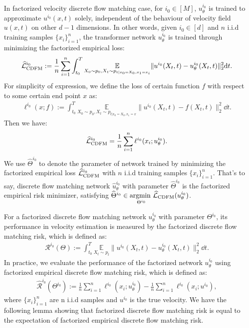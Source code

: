 \documentclass[12pt]{article}
\numberwithin{equation}{section}
\let\hat\widehat
\newcommand{\wh}{\widehat}
\renewcommand{\hat}{\wh}
\DeclareMathOperator*{\E}{{\mathbb{E}}}
\def\E{\mathbb{E}}
\theoremstyle{theoremstyle}
\numberwithin{equation}{section}
\numberwithin{theorem}{section}
\numberwithin{proposition}{section}
\numberwithin{definition}{section}
\numberwithin{lemma}{section}
\numberwithin{assumption}{section}
\numberwithin{remark}{section}
\begin{document}
In factorized velocity discrete flow matching case, for $i_0\in[M]$, $u_\theta^{i_0}$ is trained to approximate $u^{i_0}(x,t)$ solely, independent of the behaviour of velocity field $u(x,t)$ on other $d-1$ dimensions.
In other words, given $i_0\in[d]$ and $n$ i.i.d training samples $\{x_i\}_{i=1}^n$, the transformer network $u^{i_0}_\theta$ is trained through minimizing the factorized empirical loss:
\begin{align*}
    \hat{\mathcal{L}}^{i_0}_{\rm CDFM}:=\frac{1}{n}\sum_{i=1}^n\int_{t_0}^T \underset{X_0\sim p_0,X_t\sim p_{t|x_0=X_0,x_1=x_i}}{\E}\|u^{i_0}(X_t,t)-u^{i_0}_\theta(X_t,t)\|_2^2 \dd t.
\end{align*}
For simplicity of expression, we define the loss of certain function $f$ with respect to some certain end point $x$ as:
\begin{align*}
    \ell^{i_0}(x;f):=\int_{t_0}^T \underset{X_0\sim p_0,X_t\sim p_{t|x_0=X_0,x_1=x}}{\E}\|u^{i_0}(X_t,t)-f(X_t,t)\|_2^2 \dd t.
\end{align*}
Then we have:
\begin{align*}
    \hat{\mathcal{L}}^{i_0}_{\rm CDFM}=\frac{1}{n}\sum_{i=1}^n\ell^{i_0}(x_i;u^{i_0}_\theta).
\end{align*}
We use $\hat{\Theta}^{i_0}$ to denote the parameter of network trained by minimizing the factorized empirical loss $\hat{\mathcal{L}}^{i_0}_{\rm CDFM}$ with $n$ i.i.d training samples $\{x_i\}_{i=1}^n$.
That's to say, discrete flow matching network $\hat{u}^{i_0}_\theta$ with parameter $\hat{\Theta}^{i_0}$ is the factorized empirical risk minimizer, satisfying $\hat{\Theta}^{i_0}\in\underset{\Theta^{i_0}}{\rm argmin~}\hat{\mathcal{L}}_{\rm CDFM}(u^{i_0}_\theta)$.

For a factorized discrete flow matching network $u^{i_0}_\theta$ with parameter $\Theta^{i_0}$, its performance in velocity estimation is measured by the factorized discrete flow matching risk, which is defined as:
\begin{align}\label{eq:definition_of_risk_factorize}
    \mathcal{R}^{i_0}(\Theta):=\int_{t_0}^T\underset{X_t\sim p_t}{\E}\|u^{i_0}(X_t,t)-u^{i_0}_\theta(X_t,t)\|_2^2 \dd t.
\end{align}
In practice, we evaluate the performance of the factorized network $u^{i_0}_\theta$ using factorized empirical discrete flow matching risk, which is defined as:
\begin{align}\label{eq:definition_of_empirical_risk_factorize}
    \hat{\mathcal{R}}^{i_0}(\Theta^{i_0}):=\frac{1}{n}\sum_{i=1}^n\ell^{i_0}(x_i;u^{i_0}_\theta)-\frac{1}{n}\sum_{i=1}^n\ell^{i_0}(x_i;u^{i_0}),
\end{align}
where $\{x_i\}_{i=1}^n$ are n i.i.d samples and $u^{i_0}$ is the true velocity.
We have the following lemma showing that factorized discrete flow matching risk is equal to the expectation of factorized empirical discrete flow matching risk.
\end{document}
